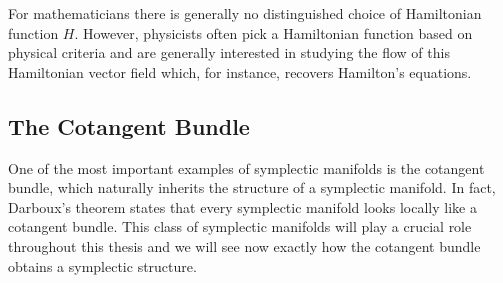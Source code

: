 For mathematicians there is generally no distinguished choice of Hamiltonian
function $H$. However, physicists often pick a Hamiltonian function based on
physical criteria and are generally interested in studying the flow of this
Hamiltonian vector field which, for instance, recovers Hamilton's equations.

\subsection{The Cotangent Bundle}
One of the most important examples of symplectic manifolds is the cotangent
bundle, which naturally inherits the structure of a symplectic manifold. In
fact, Darboux's theorem states that every symplectic manifold looks locally
like a cotangent bundle. This class of symplectic manifolds will play a crucial
role throughout this thesis and we will see now exactly how the cotangent
bundle obtains a symplectic structure.

